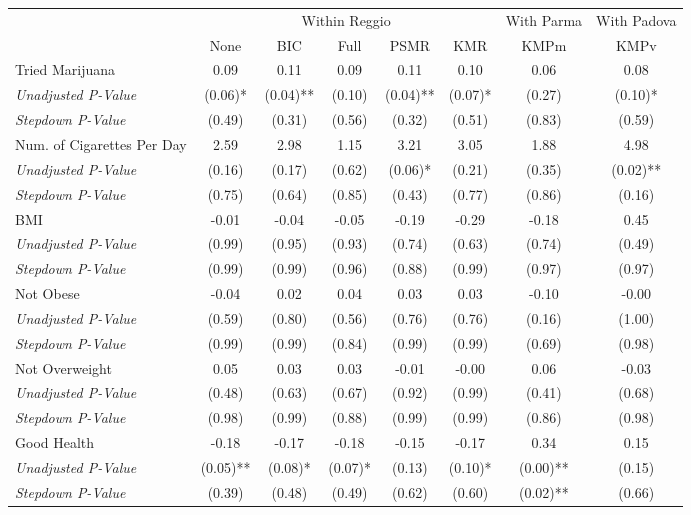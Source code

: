 \begin{tabular}{l c c c c c c c}
\toprule
& \multicolumn{5}{c}{Within Reggio} & With Parma & With Padova \\\cmidrule(lr){2-6} \cmidrule(lr){7-7} \cmidrule(lr){8-8}
 & None & BIC & Full & PSMR & KMR & KMPm & KMPv \\
\midrule
Tried Marijuana & 0.09 & 0.11 & 0.09 & 0.11 & 0.10 & 0.06 & 0.08 \\
\quad \textit{Unadjusted P-Value} & (0.06)* & (0.04)** & (0.10) & (0.04)** & (0.07)* & (0.27) & (0.10)* \\
\quad \textit{Stepdown P-Value} & (0.49) & (0.31) & (0.56) & (0.32) & (0.51) & (0.83) & (0.59) \\
Num. of Cigarettes Per Day & 2.59 & 2.98 & 1.15 & 3.21 & 3.05 & 1.88 & 4.98 \\
\quad \textit{Unadjusted P-Value} & (0.16) & (0.17) & (0.62) & (0.06)* & (0.21) & (0.35) & (0.02)** \\
\quad \textit{Stepdown P-Value} & (0.75) & (0.64) & (0.85) & (0.43) & (0.77) & (0.86) & (0.16) \\
BMI & -0.01 & -0.04 & -0.05 & -0.19 & -0.29 & -0.18 & 0.45 \\
\quad \textit{Unadjusted P-Value} & (0.99) & (0.95) & (0.93) & (0.74) & (0.63) & (0.74) & (0.49) \\
\quad \textit{Stepdown P-Value} & (0.99) & (0.99) & (0.96) & (0.88) & (0.99) & (0.97) & (0.97) \\
Not Obese & -0.04 & 0.02 & 0.04 & 0.03 & 0.03 & -0.10 & -0.00 \\
\quad \textit{Unadjusted P-Value} & (0.59) & (0.80) & (0.56) & (0.76) & (0.76) & (0.16) & (1.00) \\
\quad \textit{Stepdown P-Value} & (0.99) & (0.99) & (0.84) & (0.99) & (0.99) & (0.69) & (0.98) \\
Not Overweight & 0.05 & 0.03 & 0.03 & -0.01 & -0.00 & 0.06 & -0.03 \\
\quad \textit{Unadjusted P-Value} & (0.48) & (0.63) & (0.67) & (0.92) & (0.99) & (0.41) & (0.68) \\
\quad \textit{Stepdown P-Value} & (0.98) & (0.99) & (0.88) & (0.99) & (0.99) & (0.86) & (0.98) \\
Good Health & -0.18 & -0.17 & -0.18 & -0.15 & -0.17 & 0.34 & 0.15 \\
\quad \textit{Unadjusted P-Value} & (0.05)** & (0.08)* & (0.07)* & (0.13) & (0.10)* & (0.00)** & (0.15) \\
\quad \textit{Stepdown P-Value} & (0.39) & (0.48) & (0.49) & (0.62) & (0.60) & (0.02)** & (0.66) \\

\end{tabular}
